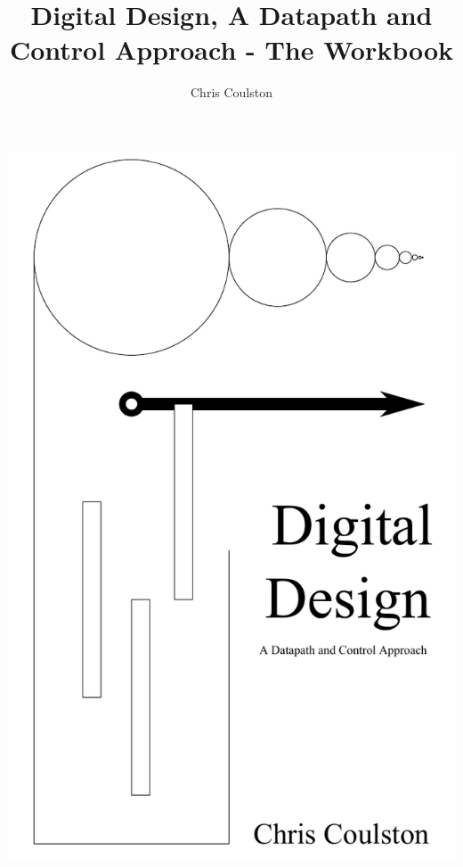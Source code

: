 \documentclass[letterpaper, 10pt]{memoir}
\begin{document}
\frontmatter
 \title{Digital Design, A Datapath and Control Approach - The Workbook}
 \author{Chris Coulston}
 \date{}
 \maketitle

\includegraphics{./Fig/cover}
\showanswers

\tableofcontents
\mainmatter


\end{document}
